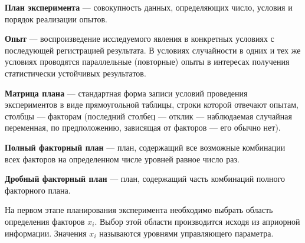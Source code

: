 \textbf{План эксперимента} — совокупность данных, определяющих число, условия и порядок реализации опытов.

\textbf{Опыт} — воспроизведение исследуемого явления в конкретных условиях с последующей регистрацией результата. В условиях случайности в одних и тех же условиях проводятся параллельные (повторные) опыты в интересах получения статистически устойчивых результатов.

\textbf{Матрица плана} — стандартная форма записи условий проведения экспериментов в виде прямоугольной таблицы, строки которой отвечают опытам, столбцы — факторам (последний столбец — отклик — наблюдаемая случайная переменная, по предположению, зависящая от факторов — его обычно нет).

\textbf{Полный факторный план} — план, содержащий все возможные комбинации всех факторов на определенном числе уровней равное число раз.

\textbf{Дробный факторный план} — план, содержащий часть комбинаций полного факторного плана.

На первом этапе планирования эксперимента необходимо выбрать область определения факторов $x_i$. Выбор этой области производится исходя из априорной информации. Значения $x_i$ называются уровнями управляющего параметра.

\clearpage

